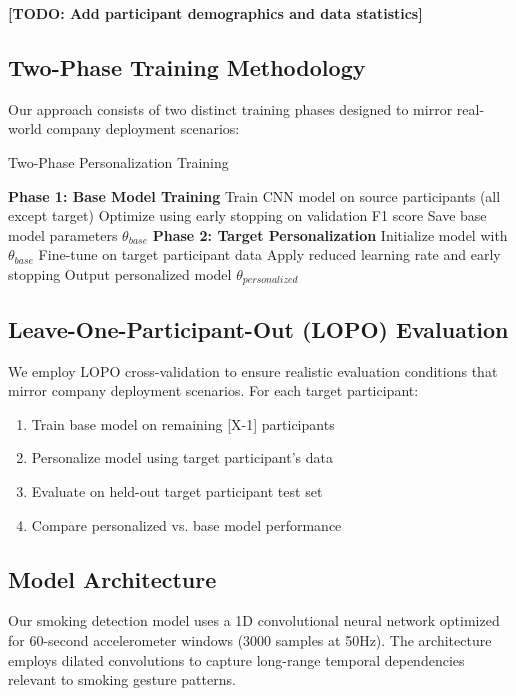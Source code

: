 \documentclass[twocolumn]{article}
\begin{document}
\textbf{[TODO: Add participant demographics and data statistics]}

\subsection{Two-Phase Training Methodology}
\label{sec:two_phase}

Our approach consists of two distinct training phases designed to mirror real-world company deployment scenarios:

\begin{algorithm}[H]
\caption{Two-Phase Personalization Training}
\label{alg:two_phase}
\begin{algorithmic}[1]
\STATE \textbf{Phase 1: Base Model Training}
\STATE Train CNN model on source participants (all except target)
\STATE Optimize using early stopping on validation F1 score
\STATE Save base model parameters $\theta_{base}$
\STATE
\STATE \textbf{Phase 2: Target Personalization}  
\STATE Initialize model with $\theta_{base}$
\STATE Fine-tune on target participant data
\STATE Apply reduced learning rate and early stopping
\STATE Output personalized model $\theta_{personalized}$
\end{algorithmic}
\end{algorithm}

\subsection{Leave-One-Participant-Out (LOPO) Evaluation}
We employ LOPO cross-validation to ensure realistic evaluation conditions that mirror company deployment scenarios. For each target participant:

\begin{enumerate}
    \item Train base model on remaining [X-1] participants
    \item Personalize model using target participant's data
    \item Evaluate on held-out target participant test set
    \item Compare personalized vs. base model performance
\end{enumerate}

\subsection{Model Architecture}
Our smoking detection model uses a 1D convolutional neural network optimized for 60-second accelerometer windows (3000 samples at 50Hz). The architecture employs dilated convolutions to capture long-range temporal dependencies relevant to smoking gesture patterns.
\end{document}
